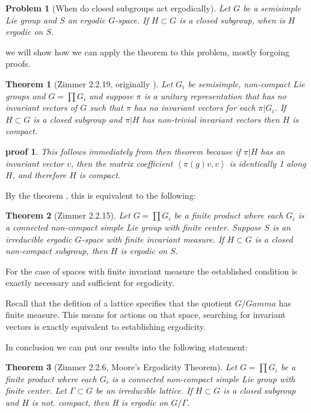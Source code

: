 \documentclass[
  12pt
]{article}
\theoremstyle{break}
\newtheorem{thm}{Theorem}[section]
\newtheorem*{problem}{Problem}
\theoremstyle{plain}
\newtheorem*{pf}{proof}
\newcommand{\G}{\ensuremath{G}\xspace}
\newcommand{\mpi}{\ensuremath{\pi}\xspace}
\newcommand{\inn}[1]{\left\langle #1 \right\rangle}
\begin{document}
  \begin{problem}[When do closed subgroups act ergodically]
    Let \G be a semisimple Lie group and $S$ an ergodic \G-space. If $H\subset G$ is a closed subgroup, when is $H$ ergodic on $S$.
  \end{problem}

  we will show how we can apply the theorem to this problem, mostly forgoing proofs.

  \begin{thm}[Zimmer 2.2.19, originally \citeauthor{Moore66}\cite{Moore66}]
    \label{thm:2.2.19}
     Let $G_i$ be semisimple, non-compact Lie groups and $G = \prod G_i$ and
     suppose \mpi is a unitary representation that has no invariant vectors of
     \G such that \mpi has no invariant vectors for each $\pi|G_i$. If $H
     \subset G$ is a closed subgroup and $\pi|H$ has non-trivial invariant
     vectors then $H$ is compact.
  \end{thm}

  \begin{pf}
    This follows immediately from then theorem because if $\pi|H$ has an invariant vector $v$, then the matrix coefficient $\inn{\pi(g)v,v}$ is identically 1 along $H$, and therefore $H$ is compact.
  \end{pf}


  By the theorem , this is equivalent to the following:


  \begin{thm}[Zimmer 2.2.15]
    \label{thm:2.2.15}
    Let $G = \prod G_i$ be a finite product where each $G_i$ is a connected
    non-compact simple Lie group with finite center. Suppose $S$ is an
    irreducible ergodic \G-space with finite invariant measure. If $H \subset
    G$ is a closed non-compact subgroup, then $H$ is ergodic on $S$.
  \end{thm}

  For the case of spaces with finite invariant measure the established condition is exactly necessary and sufficient for ergodicity.

  Recall that the defition of a lattice specifies that the quotient $G/Gamma$ has finite measure. This means for actions on that space, searching for invariant vectors is exactly equivalent to establishing ergodicity.

  In conclusion we can put our results into the following statement:

  \begin{thm}[Zimmer 2.2.6, Moore's Ergodicity Theorem]
    \label{thm:2.2.6}
    Let $G = \prod G_i$ be a finite product where each $G_i$ is a connected
    non-compact simple Lie group with finite center. Let $\Gamma \subset G$ be
    an irreducible lattice. If $H \subset G$ is a closed subgroup and $H$ is
    not. compact, then H is ergodic on $G/\Gamma$.
  \end{thm}
\end{document}
